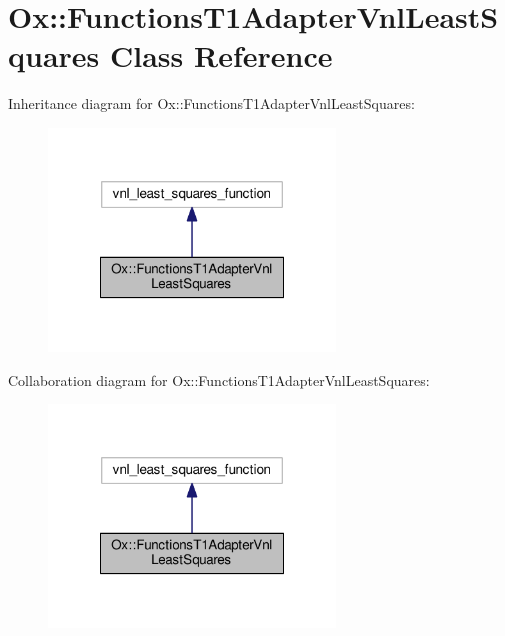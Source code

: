 \hypertarget{class_ox_1_1_functions_t1_adapter_vnl_least_squares}{\section{Ox\-:\-:Functions\-T1\-Adapter\-Vnl\-Least\-Squares Class Reference}
\label{class_ox_1_1_functions_t1_adapter_vnl_least_squares}
}


Inheritance diagram for Ox\-:\-:Functions\-T1\-Adapter\-Vnl\-Least\-Squares\-:
\nopagebreak
\begin{figure}[H]
\begin{center}
\leavevmode
\includegraphics[width=216pt]{class_ox_1_1_functions_t1_adapter_vnl_least_squares__inherit__graph}
\end{center}
\end{figure}


Collaboration diagram for Ox\-:\-:Functions\-T1\-Adapter\-Vnl\-Least\-Squares\-:
\nopagebreak
\begin{figure}[H]
\begin{center}
\leavevmode
\includegraphics[width=216pt]{class_ox_1_1_functions_t1_adapter_vnl_least_squares__coll__graph}
\end{center}
\end{figure}
